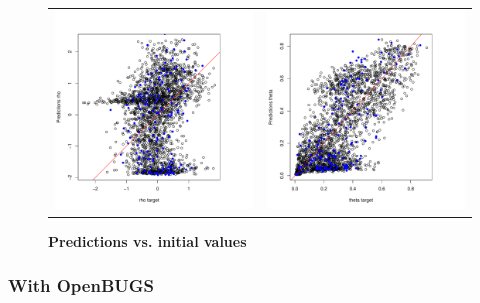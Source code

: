 \documentclass[a4paper, 12pt, leqno]{article}\usepackage[]{graphicx}\usepackage[]{color}
\begin{document}
\begin{figure}
\begin{center}
\begin{tabular}{cc}
      \includegraphics[width=6.5cm]{figures/binom-iCAR-results3.pdf} &
      \includegraphics[width=6.5cm]{figures/binom-iCAR-results4.pdf} \\
    \end{tabular}
  \end{center}
  \caption{\textbf{Predictions vs. initial values}}
  \label{fig:binom-iCAR-results}
\end{figure}

\newpage

\subsubsection{With OpenBUGS}
\end{document}
